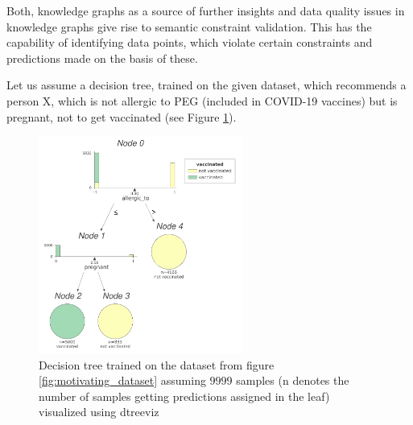     Both, knowledge graphs as a source of further insights and data quality issues in knowledge graphs give rise to semantic constraint validation. This has the capability of identifying data points, which violate certain constraints and predictions made on the basis of these.%
    
    Let us assume a decision tree, trained on the given dataset, which recommends a person X, which is not allergic to PEG (included in COVID-19 vaccines) but is pregnant, not to get vaccinated (see Figure \ref{motivating_example_decision_tree}). 
    \begin{figure}
            \centering
            \includegraphics[width=0.6\textwidth]{images/visualizations/motivating_example_decision_tree_transparent.png}
            \caption{Decision tree trained on the dataset from figure \ref{fig:motivating_dataset} assuming $9999$ samples (n denotes the number of samples getting predictions assigned in the leaf) visualized using dtreeviz \cite{dtreeviz}}
            \label{motivating_example_decision_tree}
        \end{figure}
